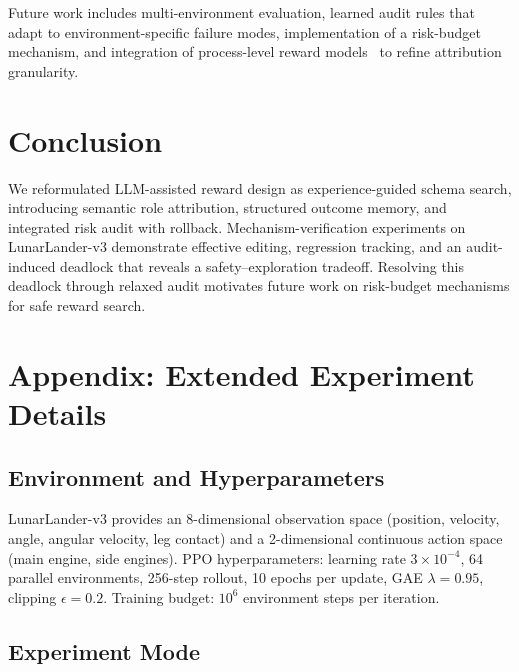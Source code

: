 \documentclass[11pt]{article}
\begin{document}
Future work includes multi-environment evaluation, learned audit rules that adapt to environment-specific failure modes, implementation of a risk-budget mechanism, and integration of process-level reward models~\citep{zheng2025prmsurvey} to refine attribution granularity.

\section{Conclusion}

We reformulated LLM-assisted reward design as experience-guided schema search, introducing semantic role attribution, structured outcome memory, and integrated risk audit with rollback. Mechanism-verification experiments on LunarLander-v3 demonstrate effective editing, regression tracking, and an audit-induced deadlock that reveals a safety--exploration tradeoff. Resolving this deadlock through relaxed audit motivates future work on risk-budget mechanisms for safe reward search.




\newpage
\appendix
\section{Appendix: Extended Experiment Details}

\subsection{Environment and Hyperparameters}

LunarLander-v3 provides an 8-dimensional observation space (position, velocity, angle, angular velocity, leg contact) and a 2-dimensional continuous action space (main engine, side engines). PPO hyperparameters: learning rate $3\times10^{-4}$, 64 parallel environments, 256-step rollout, 10 epochs per update, GAE $\lambda=0.95$, clipping $\epsilon=0.2$. Training budget: $10^6$ environment steps per iteration.

\subsection{Experiment Mode}
\end{document}
